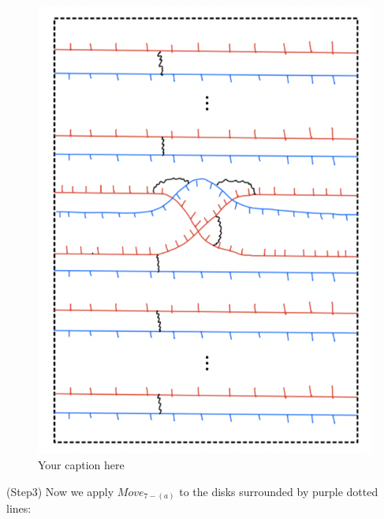 \begin{figure}[H] %
    \centering
    \includegraphics[width=\linewidth]{diagrams/theorem12/6.png} %
    \caption{Your caption here}
    \label{fig:your-label}
\end{figure}

(Step3) Now we apply $Move_{7-(a)}$ to the disks surrounded by purple dotted lines:

